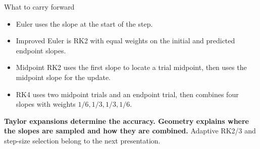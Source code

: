 \documentclass[aspectratio=169]{beamer}
\begin{document}
\begin{frame}{What to carry forward}
\begin{itemize}
\item Euler uses the slope at the start of the step.
\item Improved Euler is RK2 with equal weights on the initial and predicted endpoint slopes.
\item Midpoint RK2 uses the first slope to locate a trial midpoint, then uses the midpoint slope for the update.
\item RK4 uses two midpoint trials and an endpoint trial, then combines four slopes with weights $1/6,1/3,1/3,1/6$.
\end{itemize}
\medskip
\textbf{Taylor expansions determine the accuracy. Geometry explains where the slopes are sampled and how they are combined.}
\medskip
Adaptive RK2/3 and step-size selection belong to the next presentation.
\end{frame}
\end{document}

